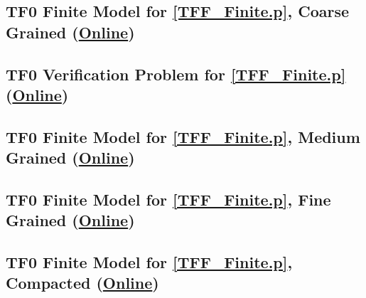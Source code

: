 \documentclass{easychair}
\begin{document}
\newpage
\subsection{TF0 Finite Model for \ref{TFF_Finite.p}, Coarse Grained
(\href{https://raw.githubusercontent.com/GeoffsPapers/InterpretationFormat/master/Examples/TFF_Finite.s}{Online})}
\label{TFF_Finite.s}
\begin{small}

\end{small}

\newpage
\subsection{TF0 Verification Problem for \ref{TFF_Finite.p}
(\href{https://raw.githubusercontent.com/GeoffsPapers/InterpretationFormat/master/Examples/TFF_Finite.s.p}{Online})}
\label{TFF_Finite.s.p}
\begin{small}

\end{small}

\newpage
\subsection{TF0 Finite Model for \ref{TFF_Finite.p}, Medium Grained
(\href{https://raw.githubusercontent.com/GeoffsPapers/InterpretationFormat/master/Examples/TFF_Finite_Medium.s}{Online})}
\label{TFF_Finite_Medium.s}
\begin{small}

\end{small}

\newpage
\subsection{TF0 Finite Model for \ref{TFF_Finite.p}, Fine Grained
(\href{https://raw.githubusercontent.com/GeoffsPapers/InterpretationFormat/master/Examples/TFF_Finite_Fine.s}{Online})}
\label{TFF_Finite_Fine.s}
\begin{small}

\end{small}

\newpage
\subsection{TF0 Finite Model for \ref{TFF_Finite.p}, Compacted
(\href{https://raw.githubusercontent.com/GeoffsPapers/InterpretationFormat/master/Examples/TFF_Finite_Compact.s}{Online})}
\label{TFF_Finite_Compact.s}
\begin{small}

\end{small}
\end{document}

